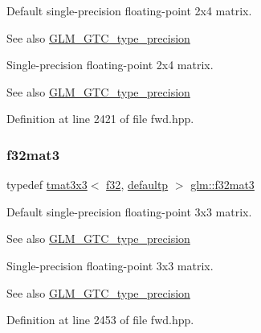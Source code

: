 Default single-\/precision floating-\/point 2x4 matrix. \begin{DoxySeeAlso}{See also}
\mbox{\hyperlink{group__gtc__type__precision}{G\+L\+M\+\_\+\+G\+T\+C\+\_\+type\+\_\+precision}}
\end{DoxySeeAlso}
Single-\/precision floating-\/point 2x4 matrix. \begin{DoxySeeAlso}{See also}
\mbox{\hyperlink{group__gtc__type__precision}{G\+L\+M\+\_\+\+G\+T\+C\+\_\+type\+\_\+precision}} 
\end{DoxySeeAlso}


Definition at line 2421 of file fwd.\+hpp.

\mbox{\label{group__gtc__type__precision_ga5fbaec59b220964f59403bb362b5f93e}} 
\subsubsection{\texorpdfstring{f32mat3}{f32mat3}}
{\footnotesize\ttfamily typedef \mbox{\hyperlink{structglm_1_1tmat3x3}{tmat3x3}}$<$ \mbox{\hyperlink{group__gtc__type__precision_ga0ec999b57f5330d9021256e96038df04}{f32}}, \mbox{\hyperlink{namespaceglm_a0f04f086094c747d227af4425893f545a9d21ccd8b5a009ec7eb7677befc3bf51}{defaultp}} $>$ \mbox{\hyperlink{group__gtc__type__precision_ga5fbaec59b220964f59403bb362b5f93e}{glm\+::f32mat3}}}

Default single-\/precision floating-\/point 3x3 matrix. \begin{DoxySeeAlso}{See also}
\mbox{\hyperlink{group__gtc__type__precision}{G\+L\+M\+\_\+\+G\+T\+C\+\_\+type\+\_\+precision}}
\end{DoxySeeAlso}
Single-\/precision floating-\/point 3x3 matrix. \begin{DoxySeeAlso}{See also}
\mbox{\hyperlink{group__gtc__type__precision}{G\+L\+M\+\_\+\+G\+T\+C\+\_\+type\+\_\+precision}} 
\end{DoxySeeAlso}


Definition at line 2453 of file fwd.\+hpp.

\mbox{\label{group__gtc__type__precision_ga61653615c76194cdf3454e6e703525e0}} 

